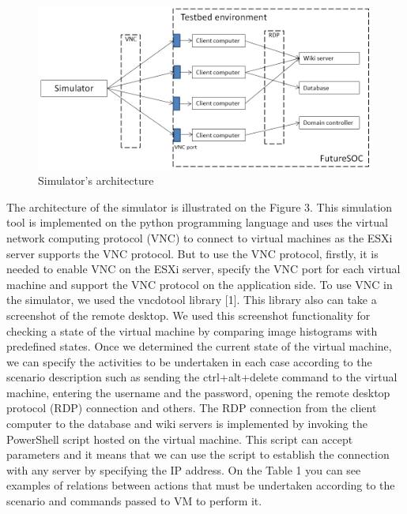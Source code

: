\begin{figure}[ht!]
\centering
\includegraphics[width=\textwidth]{simulator_architecture.png}
\caption{Simulator's architecture}
\label{overflow}
\end{figure}

The architecture of the simulator is illustrated on the Figure 3. This simulation tool is implemented on the python programming language and uses the virtual network computing protocol (VNC) to connect to virtual machines as the ESXi server supports the VNC protocol. But to use the VNC protocol, firstly, it is needed to enable VNC on the ESXi server, specify the VNC port for each virtual machine and support the VNC protocol on the application side. To use VNC in the simulator, we used the vncdotool library [1]. This library also can take a screenshot of the remote desktop. We used this screenshot functionality for checking a state of the virtual machine by comparing image histograms with predefined states. Once we determined the current state of the virtual machine, we can specify the activities to be undertaken in each case according to the scenario description such as sending the ctrl+alt+delete command to the virtual machine, entering the username and the password, opening the remote desktop protocol (RDP) connection and others. The RDP connection from the client computer to the database and wiki servers is implemented by invoking the PowerShell script hosted on the virtual machine. This script can accept parameters and it means that we can use the script to establish the connection with any server by specifying the IP address. On the Table 1 you can see examples of relations between actions that must be undertaken according to the scenario and commands passed to VM to perform it.

